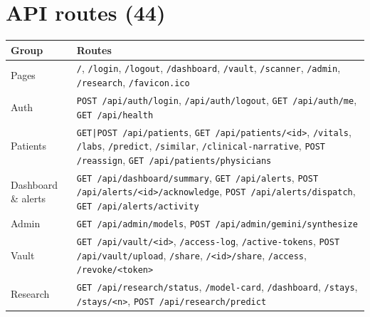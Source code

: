 \section*{API routes (44)}
\begin{footnotesize}
\begin{tabularx}{\textwidth}{@{}lY@{}}
\toprule
Group & Routes\\
\midrule
Pages & \texttt{/}, \texttt{/login}, \texttt{/logout}, \texttt{/dashboard}, \texttt{/vault}, \texttt{/scanner}, \texttt{/admin}, \texttt{/research}, \texttt{/favicon.ico}\\
Auth & \texttt{POST /api/auth/login}, \texttt{/api/auth/logout}, \texttt{GET /api/auth/me}, \texttt{GET /api/health}\\
Patients & \texttt{GET|POST /api/patients}, \texttt{GET /api/patients/<id>}, \texttt{/vitals}, \texttt{/labs}, \texttt{/predict}, \texttt{/similar}, \texttt{/clinical-narrative}, \texttt{POST /reassign}, \texttt{GET /api/patients/physicians}\\
Dashboard \& alerts & \texttt{GET /api/dashboard/summary}, \texttt{GET /api/alerts}, \texttt{POST /api/alerts/<id>/acknowledge}, \texttt{POST /api/alerts/dispatch}, \texttt{GET /api/alerts/activity}\\
Admin & \texttt{GET /api/admin/models}, \texttt{POST /api/admin/gemini/synthesize}\\
Vault & \texttt{GET /api/vault/<id>}, \texttt{/access-log}, \texttt{/active-tokens}, \texttt{POST /api/vault/upload}, \texttt{/share}, \texttt{/<id>/share}, \texttt{/access}, \texttt{/revoke/<token>}\\
Research & \texttt{GET /api/research/status}, \texttt{/model-card}, \texttt{/dashboard}, \texttt{/stays}, \texttt{/stays/<n>}, \texttt{POST /api/research/predict}\\
\bottomrule
\end{tabularx}
\end{footnotesize}
